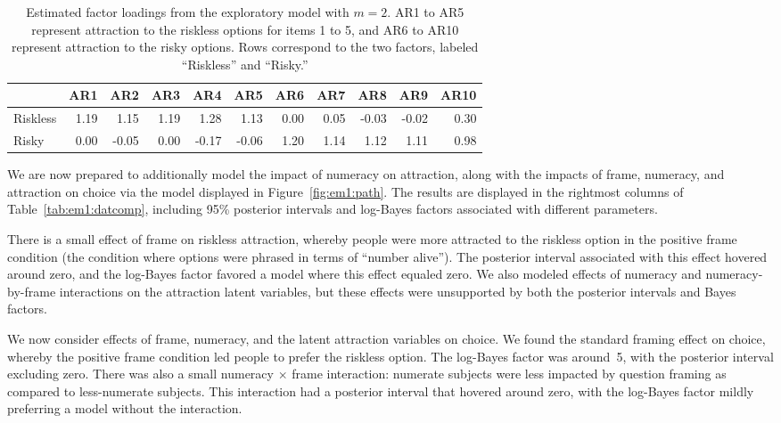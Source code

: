 \begin{table}
\caption{Estimated factor loadings from the exploratory model with $m=2$. AR1 to AR5 represent attraction to the riskless options for items 1 to 5, and AR6 to AR10 represent attraction to the risky options.  Rows correspond to the two factors, labeled ``Riskless'' and ``Risky.''}
\label{tab:em1:2fload}
\centering
{\small
\begin{tabular}{lrrrrrrrrrr}\\
         &  AR1 &   AR2 &  AR3 &   AR4 &   AR5 &  AR6 &  AR7 &   AR8 &   AR9 & AR10 \\\hline
Riskless & 1.19 &  1.15 & 1.19 &  1.28 &  1.13 & 0.00 & 0.05 & -0.03 & -0.02 & 0.30 \\
Risky    & 0.00 & -0.05 & 0.00 & -0.17 & -0.06 & 1.20 & 1.14 &  1.12 &  1.11 & 0.98 \\ 
\end{tabular}}
\end{table}

We are now prepared to additionally model the impact of numeracy on attraction, along with the impacts of frame, numeracy, and attraction on choice via the model displayed in Figure~\ref{fig:em1:path}.  The results are displayed in the rightmost columns of Table~\ref{tab:em1:datcomp}, including 95\% posterior intervals and log-Bayes factors associated with different parameters.

There is a small effect of frame on riskless attraction, whereby people were more attracted to the riskless option in the positive frame condition (the condition where options were phrased in terms of ``number alive'').  The posterior interval associated with this effect hovered around zero, and the log-Bayes factor favored a model where this effect equaled zero. We also modeled effects of numeracy and numeracy-by-frame interactions on the attraction latent variables, but these effects were unsupported by both the posterior intervals and Bayes factors.

We now consider effects of frame, numeracy, and the latent attraction variables on choice.  We found the standard framing effect on choice, whereby the positive frame condition led people to prefer the riskless option.  The log-Bayes factor was around~5, with the posterior interval excluding zero. There was also a small numeracy $\times$ frame interaction: numerate subjects were less impacted by question framing as compared to less-numerate subjects.  This interaction had a posterior interval that hovered around zero, with the log-Bayes factor mildly preferring a model without the interaction.

